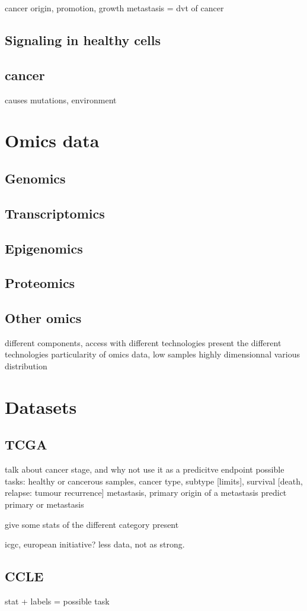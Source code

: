 \documentclass[../main.tex]{subfiles}
\begin{document}
 cancer origin, promotion, growth metastasis = dvt of cancer
 \subsection{Signaling in healthy cells}
 \subsection{cancer}
     causes mutations, environment


\section{Omics data}
 \subsection{Genomics}
 \subsection{Transcriptomics}
 \subsection{Epigenomics}
 \subsection{Proteomics}
 \subsection{Other omics}
     different components, access with different technologies
     present the different technologies
     particularity of omics data, low samples highly dimensionnal
     various distribution

\section{Datasets}
 \subsection{TCGA}
     talk about cancer stage, and why not use it as a predicitve endpoint
     possible tasks: healthy or cancerous samples, cancer type, subtype [limits], survival [death, relapse: tumour recurrence] metastasis,
     primary origin of a metastasis %
     predict primary or metastasis %

     give some stats of the different category present

     icgc, european initiative? less data, not as strong.
 \subsection{CCLE}

     stat + labels = possible task
\end{document}
